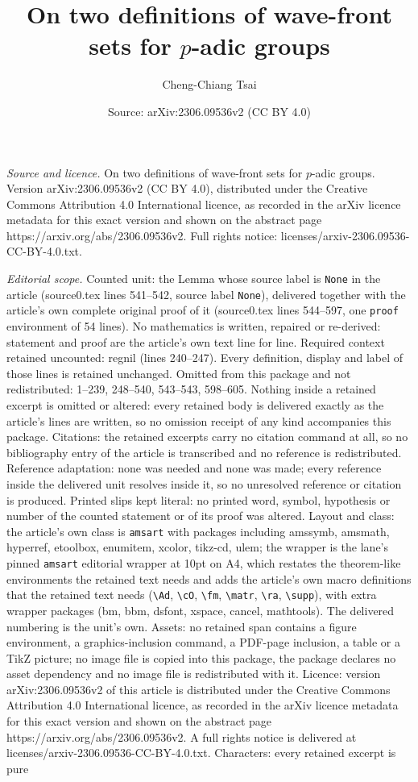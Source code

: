 \documentclass[10pt,a4paper]{amsart}
\title[On two definitions of wave-front sets for $p$-adic groups]{On two definitions of wave-front sets for $p$-adic groups}
\author{Cheng-Chiang Tsai}
\date{Source: arXiv:2306.09536v2 (CC BY 4.0)}
\begin{document}
\maketitle

\noindent\emph{Source and licence.} On two definitions of wave-front sets for $p$-adic groups. Version arXiv:2306.09536v2 (CC BY 4.0), distributed under the Creative Commons Attribution 4.0 International licence, as recorded in the arXiv licence metadata for this exact version and shown on the abstract page https://arxiv.org/abs/2306.09536v2. Full rights notice: licenses/arxiv-2306.09536-CC-BY-4.0.txt.\par\smallskip

\noindent\textit{Editorial scope.} Counted unit: the Lemma whose source label is \texttt{None} in the article (source0.tex lines 541--542, source label \texttt{None}), delivered together with the article's own complete original proof of it (source0.tex lines 544--597, one \texttt{proof} environment of 54 lines). No mathematics is written, repaired or re-derived: statement and proof are the article's own text line for line. Required context retained uncounted: regnil (lines 240--247). Every definition, display and label of those lines is retained unchanged. Omitted from this package and not redistributed: 1--239, 248--540, 543--543, 598--605. Nothing inside a retained excerpt is omitted or altered: every retained body is delivered exactly as the article's lines are written, so no omission receipt of any kind accompanies this package. Citations: the retained excerpts carry no citation command at all, so no bibliography entry of the article is transcribed and no reference is redistributed. Reference adaptation: none was needed and none was made; every reference inside the delivered unit resolves inside it, so no unresolved reference or citation is produced. Printed slips kept literal: no printed word, symbol, hypothesis or number of the counted statement or of its proof was altered. Layout and class: the article's own class is \texttt{amsart} with packages including amssymb, amsmath, hyperref, etoolbox, enumitem, xcolor, tikz-cd, ulem; the wrapper is the lane's pinned \texttt{amsart} editorial wrapper at 10pt on A4, which restates the theorem-like environments the retained text needs and adds the article's own macro definitions that the retained text needs (\texttt{\textbackslash Ad}, \texttt{\textbackslash cO}, \texttt{\textbackslash fm}, \texttt{\textbackslash matr}, \texttt{\textbackslash ra}, \texttt{\textbackslash supp}), with extra wrapper packages (bm, bbm, dsfont, xspace, cancel, mathtools). The delivered numbering is the unit's own. Assets: no retained span contains a figure environment, a graphics-inclusion command, a PDF-page inclusion, a table or a TikZ picture; no image file is copied into this package, the package declares no asset dependency and no image file is redistributed with it. Licence: version arXiv:2306.09536v2 of this article is distributed under the Creative Commons Attribution 4.0 International licence, as recorded in the arXiv licence metadata for this exact version and shown on the abstract page https://arxiv.org/abs/2306.09536v2. A full rights notice is delivered at licenses/arxiv-2306.09536-CC-BY-4.0.txt. Characters: every retained excerpt is pure 
\end{document}

